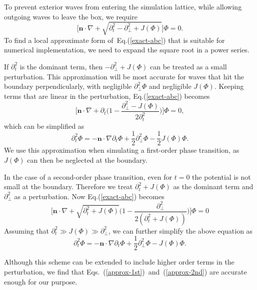 \documentclass[prd,twocolumn,nofootinbib]{revtex4-1}
\begin{document}
To prevent exterior waves from entering the simulation lattice,
while allowing outgoing waves to leave the box, we
require
\begin{equation}
\big[\bm{n}\cdot\nabla+\sqrt{\partial_t^2-\partial_\perp^2+J(\Phi)}\big]\Phi=0.
\label{exact-abc}
\end{equation}
To find a local approximate form of~Eq.(\ref{exact-abc}) that is suitable
for numerical implementation, we need to expand the square root in a power
series.

If $\partial_t^2$ is the dominant term, then 
$-\partial_\perp^2+J(\Phi)$ can be treated as a small perturbation. 
This approximation will be most accurate for waves that hit the boundary
perpendicularly, with negligible $\partial_\perp^2 \Phi$ 
and negligible $J(\Phi)$.
Keeping terms that are linear in the perturbation, 
Eq.(\ref{exact-abc}) becomes 
\begin{equation}
\Bigg[ \bm{n}\cdot\nabla + \partial_t \bigg(1-\frac{\partial_\perp^2-J(\Phi)}{2\partial_t^2} \bigg) \Bigg] \Phi=0,
\end{equation}
which can be simplified as 
\begin{equation}
\partial_t^2 \Phi = -\bm{n}\cdot\nabla \partial_t \Phi +\frac{1}{2} \partial_\perp^2 \Phi -\frac{1}{2}J(\Phi)\Phi.
\label{approx-1st}
\end{equation}
We use this approximation when simulating a first-order phase transition, 
as $J(\Phi)$ can then be neglected at the boundary. 

In the case of a second-order phase transition, 
even for $t=0$ the potential is not 
small at the boundary. Therefore we treat $\partial_t^2+J(\Phi)$ as the 
dominant term and $ \partial_\perp^2 $ as a perturbation. 
Now Eq.(\ref{exact-abc}) becomes
\begin{equation}
\Bigg[ \bm{n}\cdot\nabla +\sqrt{\partial_t^2+J(\Phi)} \bigg( 1-\frac{\partial_\perp^2}{2(\partial_t^2+J(\Phi))}\bigg) \Bigg] \Phi=0
\end{equation}
Assuming that $\partial_t^2 \gg J(\Phi) \gg \partial_\perp^2$, 
we can further simplify the above equation as
\begin{equation}
\partial_t^2 \Phi = -\bm{n}\cdot\nabla \partial_t \Phi +
	\frac{1}{2}\partial_\perp^2 \Phi -J(\Phi)\Phi.
\label{approx-2nd}
\end{equation}

Although this scheme can be extended to include higher order terms in the 
perturbation, we find that Eqs.~(\ref{approx-1st})~and~(\ref{approx-2nd}) are 
accurate enough for our purpose.
\end{document}
